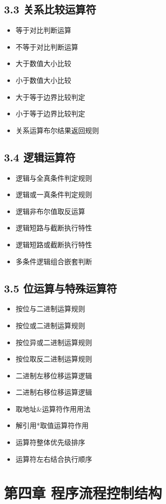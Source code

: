 \subsection{3.3 关系比较运算符}
\begin{itemize}
\item 等于对比判断运算
\item 不等于对比判断运算
\item 大于数值大小比较
\item 小于数值大小比较
\item 大于等于边界比较判定
\item 小于等于边界比较判定
\item 关系运算布尔结果返回规则
\end{itemize}

\subsection{3.4 逻辑运算符}
\begin{itemize}
\item 逻辑与全真条件判定规则
\item 逻辑或一真条件判定规则
\item 逻辑非布尔值取反运算
\item 逻辑短路与截断执行特性
\item 逻辑短路或截断执行特性
\item 多条件逻辑组合嵌套判断
\end{itemize}

\subsection{3.5 位运算与特殊运算符}
\begin{itemize}
\item 按位与二进制运算规则
\item 按位或二进制运算规则
\item 按位异或二进制运算规则
\item 按位取反二进制运算规则
\item 二进制左移位移运算逻辑
\item 二进制右移位移运算逻辑
\item 取地址&运算符作用用法
\item 解引用*取值运算符作用
\item 运算符整体优先级排序
\item 运算符左右结合执行顺序
\end{itemize}

\section{第四章 程序流程控制结构}
